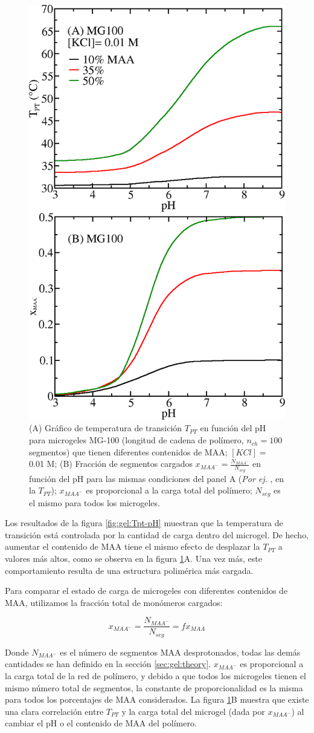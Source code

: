 \begin{figure}[!tb]
	\centering
	\includegraphics[width=0.40\linewidth]{Figures/graph-gel/Tpt-pH_MAA.png}
	\caption{(A) Gr\'afico de temperatura de transici\'on $T_{PT}$ en funci\'on del pH para microgeles MG-100 (longitud de cadena de pol\'imero, $n_{ch}=100$ segmentos) que tienen diferentes contenidos de MAA; $[KCl]=$ 0.01 M;
	(B) Fracci\'on de segmentos cargados $x_{MAA^-}=\frac{N_{MAA^-}}{N_{seg}}$ en funci\'on del pH para las mismas condiciones del panel A (\emph{Por ej.} , en la $T_{PT}$); $x_{MAA^-}$ es proporcional a la carga total del pol\'imero; $N_{seg}$ es el mismo para todos los microgeles.}
	\label{fig:gel:Tpt_MAA}
\end{figure}

Los resultados de la figura \ref{fig:gel:Tpt-pH} muestran que la temperatura de transici\'on est\'a controlada por la cantidad de carga dentro del microgel. De hecho, aumentar el contenido de MAA tiene el mismo efecto de desplazar la $T_{PT}$ a valores m\'as altos, como se observa en la figura \ref{fig:gel:Tpt_MAA}A. Una vez m\'as, este comportamiento resulta de una estructura polim\'erica m\'as cargada.

Para comparar el estado de carga de microgeles con diferentes contenidos de MAA, utilizamos la fracci\'on total de mon\'omeros cargados:

\begin{equation}
	x_{MAA^-}=\frac{N_{MAA^-}}{N_{seg}}=f x_{MAA}
\end{equation}

Donde $N_{MAA^-}$ es el n\'umero de segmentos MAA desprotonados, todas las dem\'as cantidades se han definido en la secci\'on \ref{sec:gel:theory}. $x_{MAA^-}$ es proporcional a la carga total de la red de pol\'imero, y debido a que todos los microgeles tienen el mismo n\'umero total de segmentos, la constante de proporcionalidad es la misma para todos los porcentajes de MAA considerados. La figura \ref{fig:gel:Tpt_MAA}B muestra que existe una clara correlaci\'on entre $T_{PT}$ y la carga total del microgel (dada por $x_{MAA^-}$) al cambiar el pH o el contenido de MAA del pol\'imero.


